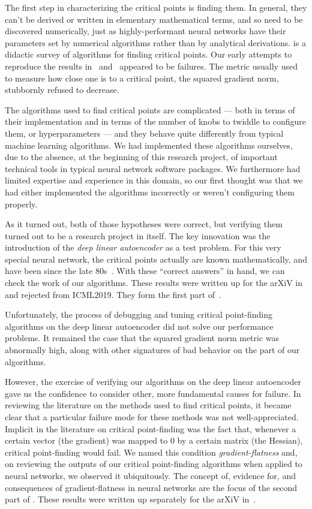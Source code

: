 \documentclass[../../thesis.tex]{subfiles}
\begin{document}
The first step in characterizing the critical points is finding them.
In general, they can't be derived or written in elementary mathematical terms,
and so need to be discovered numerically,
just as highly-performant neural networks have their parameters set
by numerical algorithms rather than by analytical derivations.
 is a didactic survey of algorithms
for finding critical points.
Our early attempts to reproduce the results
in~\cite{dauphin2014} and~\cite{pennington2017}
appeared to be failures.
The metric usually used to measure how close one is
to a critical point, the squared gradient norm,
stubbornly refused to decrease.

The algorithms used to find critical points are complicated ---
both in terms of their implementation and in terms of the number of knobs
to twiddle to configure them, or hyperparameters ---
and they behave quite differently from typical machine learning algorithms.
We had implemented these algorithms ourselves,
due to the absence, at the beginning of this research project,
of important technical tools in typical neural network software packages.
We furthermore had limited expertise and experience in this domain,
so our first thought was that we had either implemented the algorithms incorrectly
or weren't configuring them properly.

As it turned out, both of those hypotheses were correct,
but verifying them turned out to be a research project in itself.
The key innovation was the introduction of the \emph{deep linear autoencoder}
as a test problem.
For this very special neural network,
the critical points actually are known mathematically,
and have been since the late 80s~\cite{baldi1989}.
With these \enquote{correct answers} in hand,
we can check the work of our algorithms.
These results were written up for the arXiV
in~\cite{frye2019}
and rejected from ICML2019.
They form the first part of~.

Unfortunately, the process of debugging and tuning critical point-finding
algorithms on the deep linear autoencoder did not solve
our performance problems.
It remained the case that the squared gradient norm metric was abnormally high,
along with other signatures of bad behavior on the part of our algorithms.

However, the exercise of verifying our algorithms on the deep linear autoencoder
gave us the confidence to consider other, more fundamental causes for failure.
In reviewing the literature on the methods used to find critical points,
it became clear that a particular failure mode for these methods
was not well-appreciated.
Implicit in the literature on critical point-finding was the fact that,
whenever a certain vector (the gradient)
was mapped to 0 by a certain matrix (the Hessian),
critical point-finding would fail.
We named this condition \emph{gradient-flatness}
and, on reviewing the outputs of our critical point-finding algorithms
when applied to neural networks,
we observed it ubiquitously.
The concept of, evidence for, and consequences of gradient-flatness
in neural networks are the focus of the second part of .
These results were written up separately for the arXiV
in~\cite{frye2020}.
\end{document}
